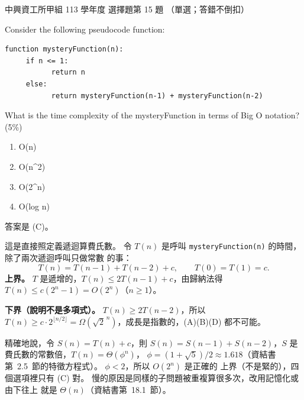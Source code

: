 \begin{pastexam}[label={px:nchu-113-dsa-15}]{中興資工所甲組 113 學年度 選擇題第 15 題}
（單選；答錯不倒扣）

Consider the following pseudocode function:
\begin{verbatim}
function mysteryFunction(n):
     if n <= 1:
           return n
     else:
           return mysteryFunction(n-1) + mysteryFunction(n-2)
\end{verbatim}
What is the time complexity of the mysteryFunction in terms of Big O notation? (5\%)
\begin{enumerate}[label=(\Alph*)]
\item O(n)
\item O(n\^{}2)
\item O(2\^{}n)
\item O(log n)
\end{enumerate}
\end{pastexam}

\begin{pastsoln}
答案是 (C)。

這是直接照定義遞迴算費氏數。 令 $T(n)$ 是呼叫 \texttt{mysteryFunction(n)} 的時間，除了兩次遞迴呼叫只做常數
的事：
\[
T(n) = T(n-1) + T(n-2) + c,\qquad T(0) = T(1) = c.
\]
\textbf{上界。} $T$ 是遞增的，$T(n) \le 2T(n-1) + c$，由歸納法得 $T(n) \le c(2^n - 1) = O(2^n)$（$n \ge 1$）。

\textbf{下界（說明不是多項式）。} $T(n) \ge 2T(n-2)$，所以 $T(n) \ge c \cdot 2^{\lfloor n/2 \rfloor} =
\Omega(\sqrt{2}^{\,n})$，成長是指數的，(A)(B)(D) 都不可能。

精確地說，令 $S(n) = T(n) + c$，則 $S(n) = S(n-1) + S(n-2)$，$S$ 是費氏數的常數倍，$T(n) = \Theta(\phi^n)$，
$\phi = (1 + \sqrt{5})/2 \approx 1.618$（資結書第~2.5~節的特徵方程式）。 $\phi < 2$，所以 $O(2^n)$ 是正確的
上界（不是緊的），四個選項裡只有 (C) 對。 慢的原因是同樣的子問題被重複算很多次，改用記憶化或由下往上
就是 $\Theta(n)$（資結書第~18.1~節）。
\end{pastsoln}
